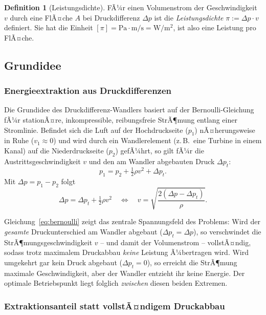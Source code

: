 ﻿\documentclass[a4paper,12pt]{article}
\theoremstyle{definition}
\newtheorem{definition}{Definition}
\begin{document}
\begin{definition}[Leistungsdichte]
	FÃ¼r einen Volumenstrom der Geschwindigkeit $v$ durch eine FlÃ¤che $A$
	bei Druckdifferenz $\Delta p$ ist die \emph{Leistungsdichte}
	$\pi := \Delta p \cdot v$ definiert. Sie hat die Einheit
	$[\pi] = \mathrm{Pa} \cdot \mathrm{m/s} = \mathrm{W/m^2}$, ist also
	eine Leistung pro FlÃ¤che.
\end{definition}

\subsection{Grundidee}

\subsubsection{Energieextraktion aus Druckdifferenzen}

Die Grundidee des Druckdifferenz-Wandlers basiert auf der
Bernoulli-Gleichung fÃ¼r stationÃ¤re, inkompressible, reibungsfreie
StrÃ¶mung entlang einer Stromlinie. Befindet sich die Luft auf der
Hochdruckseite ($p_1$) nÃ¤herungsweise in Ruhe ($v_1 \approx 0$) und wird
durch ein Wandlerelement (z.\,B.\ eine Turbine in einem Kanal) auf die
Niederdruckseite ($p_2$) gefÃ¼hrt, so gilt fÃ¼r die Austrittsgeschwindigkeit
$v$ und den am Wandler abgebauten Druck $\Delta p_t$:
\[
	p_1 = p_2 + \tfrac{1}{2}\rho v^2 + \Delta p_t.
\]
Mit $\Delta p = p_1 - p_2$ folgt
\begin{equation}
	\label{eq:bernoulli}
	\Delta p = \Delta p_t + \tfrac{1}{2}\rho v^2
	\quad\Longleftrightarrow\quad
	v = \sqrt{\frac{2(\Delta p - \Delta p_t)}{\rho}}.
\end{equation}

Gleichung~\eqref{eq:bernoulli} zeigt das zentrale Spannungsfeld des
Problems: Wird der \emph{gesamte} Druckunterschied am Wandler abgebaut
($\Delta p_t = \Delta p$), so verschwindet die StrÃ¶mungsgeschwindigkeit
$v$ -- und damit der Volumenstrom -- vollstÃ¤ndig, sodass trotz maximalem
Druckabbau \emph{keine} Leistung Ã¼bertragen wird. Wird umgekehrt gar kein
Druck abgebaut ($\Delta p_t = 0$), so erreicht die StrÃ¶mung maximale
Geschwindigkeit, aber der Wandler entzieht ihr keine Energie. Der
optimale Betriebspunkt liegt folglich \emph{zwischen} diesen beiden
Extremen.

\subsubsection{Extraktionsanteil statt vollstÃ¤ndigem Druckabbau}
\end{document}
